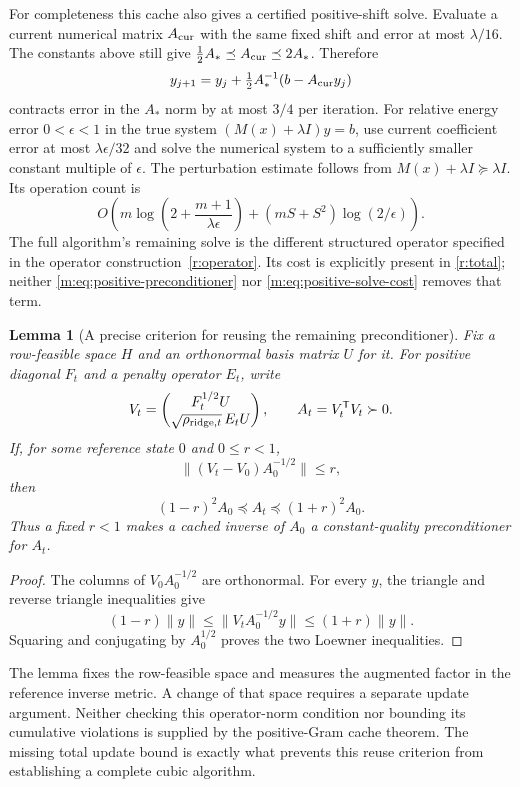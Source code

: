 \documentclass[11pt]{amsart}
\newtheorem{lemma}[theorem]{Lemma}
\theoremstyle{definition}\newtheorem{definition}[theorem]{Definition}
\theoremstyle{remark}\newtheorem{remark}[theorem]{Remark}
\numberwithin{equation}{section}
\begin{document}
For completeness this cache also gives a certified positive-shift solve.
Evaluate a current numerical matrix $A_{\rm cur}$ with the same fixed
shift and error at most $\lambda/16$. The constants above still give
$\tfrac12 A_*\preceq A_{\rm cur}\preceq2A_*$. Therefore
\[
 y_{j+1}=y_j+\tfrac12 A_*^{-1}(b-A_{\rm cur}y_j)
\]
contracts error in the $A_*$ norm by at most $3/4$ per iteration.
For relative energy error $0<\epsilon<1$ in the true system
$(M(x)+\lambda I)y=b$, use current coefficient error at most
$\lambda\epsilon/32$ and solve the numerical system to a sufficiently
smaller constant multiple of $\epsilon$. The perturbation estimate follows
from $M(x)+\lambda I\succeq\lambda I$. Its operation count is
\begin{equation}
 O\!\left(m\log\!\left(2+\frac{m+1}{\lambda\epsilon}\right)
 +(mS+S^2)\log(2/\epsilon)\right).                         \label{m:eq:positive-solve-cost}
\end{equation}
The full algorithm's remaining solve is the different structured operator
specified in the operator construction~\ref{r:operator}. Its cost is explicitly present in
\eqref{r:total}; neither \eqref{m:eq:positive-preconditioner} nor
\eqref{m:eq:positive-solve-cost} removes that term.

\begin{lemma}[A precise criterion for reusing the remaining preconditioner]
\label{m:reuse}
Fix a row-feasible space $H$ and an orthonormal basis matrix $U$ for it.
For positive diagonal $F_t$ and a penalty operator $E_t$, write
\[
 V_t=\begin{pmatrix}F_t^{1/2}U\\ \sqrt{\rho_{{\rm ridge},t}}\,E_tU\end{pmatrix},
 \qquad A_t=V_t^{\mathsf T}V_t\succ0.
\]
If, for some reference state $0$ and $0\le r<1$,
\[
                \|(V_t-V_0)A_0^{-1/2}\|\le r,
\]
then
\[
              (1-r)^2A_0\preceq A_t\preceq(1+r)^2A_0.
\]
Thus a fixed $r<1$ makes a cached inverse of $A_0$ a constant-quality
preconditioner for $A_t$.
\end{lemma}
\begin{proof}
The columns of $V_0A_0^{-1/2}$ are orthonormal. For every $y$, the triangle
and reverse triangle inequalities give
\[
 (1-r)\|y\|\le\|V_tA_0^{-1/2}y\|\le(1+r)\|y\|.
\]
Squaring and conjugating by $A_0^{1/2}$ proves the two Loewner inequalities.
\end{proof}
The lemma fixes the row-feasible space and measures the augmented factor
in the reference inverse metric. A change of that space requires a
separate update argument. Neither checking this operator-norm condition
nor bounding its cumulative violations is supplied by the positive-Gram
cache theorem. The missing total update bound is exactly what prevents
this reuse criterion from establishing a complete cubic algorithm.
\end{document}

